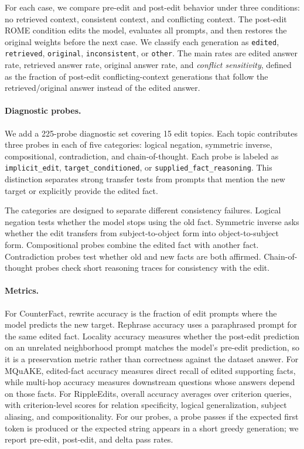 \documentclass[11pt]{article}
\begin{document}
For each case, we compare pre-edit and post-edit behavior under three conditions: no retrieved context, consistent context, and conflicting context. The post-edit ROME condition edits the model, evaluates all prompts, and then restores the original weights before the next case. We classify each generation as \texttt{edited}, \texttt{retrieved}, \texttt{original}, \texttt{inconsistent}, or \texttt{other}. The main rates are edited answer rate, retrieved answer rate, original answer rate, and \emph{conflict sensitivity}, defined as the fraction of post-edit conflicting-context generations that follow the retrieved/original answer instead of the edited answer.

\paragraph{Diagnostic probes.}
We add a 225-probe diagnostic set covering 15 edit topics. Each topic contributes three probes in each of five categories: logical negation, symmetric inverse, compositional, contradiction, and chain-of-thought. Each probe is labeled as \texttt{implicit\_edit}, \texttt{target\_conditioned}, or \texttt{supplied\_fact\_reasoning}. This distinction separates strong transfer tests from prompts that mention the new target or explicitly provide the edited fact.

The categories are designed to separate different consistency failures. Logical negation tests whether the model stops using the old fact. Symmetric inverse asks whether the edit transfers from subject-to-object form into object-to-subject form. Compositional probes combine the edited fact with another fact. Contradiction probes test whether old and new facts are both affirmed. Chain-of-thought probes check short reasoning traces for consistency with the edit.

\paragraph{Metrics.}
For CounterFact, rewrite accuracy is the fraction of edit prompts where the model predicts the new target. Rephrase accuracy uses a paraphrased prompt for the same edited fact. Locality accuracy measures whether the post-edit prediction on an unrelated neighborhood prompt matches the model's pre-edit prediction, so it is a preservation metric rather than correctness against the dataset answer. For MQuAKE, edited-fact accuracy measures direct recall of edited supporting facts, while multi-hop accuracy measures downstream questions whose answers depend on those facts. For RippleEdits, overall accuracy averages over criterion queries, with criterion-level scores for relation specificity, logical generalization, subject aliasing, and compositionality. For our probes, a probe passes if the expected first token is produced or the expected string appears in a short greedy generation; we report pre-edit, post-edit, and delta pass rates.
\end{document}
